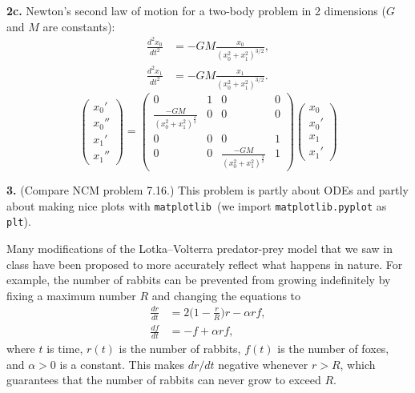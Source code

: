 \documentclass[11pt]{article}
\newcommand{\matplotlib}{{\tt matplotlib}}  %
\begin{document}
\par\bigskip
{\bf 2c.} Newton's second law of motion for a two-body problem in 2 dimensions 
($G$ and $M$ are constants):
\begin{align}
\frac{d^2 x_0}{dt^2} &= -GM\frac{x_0}{(x_0^2 + x_1^2)^{3/2}}, \\
\frac{d^2 x_1}{dt^2} &= -GM\frac{x_1}{(x_0^2 + x_1^2)^{3/2}}.
\end{align}
$$\left(
   \begin{array}{c}
      x_0'\\ 	
      x_0''\\
       	x_1'\\x_1''
   \end{array} \right)=
   \left(
   \begin{array}{cccc}
      0&1&0&0 \\ 	
      \frac{-GM}{(x_0^2+x_1^2)^{\frac{3}{2}}}&0 	&0&0\\
      0&0&0&1\\
      0&0&\frac{-GM}{(x_0^2+x_1^2)^{\frac{3}{2}}}&1
   \end{array} \right)
   \left(
   \begin{array}{c}
      x_0\\ 	
      x_0'\\ x_1 \\	x_1'
   \end{array} \right)$$

\par\bigskip
{\bf 3.} (Compare NCM problem 7.16.)
This problem is partly about ODEs and partly about making nice plots with
\matplotlib\ (we import {\tt matplotlib.pyplot} as {\tt plt}).

Many modifications of the Lotka--Volterra predator-prey model
that we saw in class have been proposed to
more accurately reflect what happens in nature.
For example, the number of rabbits can be prevented from growing
indefinitely by fixing a maximum number $R$ and changing the equations to
\begin{align}
\frac{dr}{dt} &= 2\Big(1-\frac{r}{R}\Big)r - \alpha rf, \\
\frac{df}{dt} &= -f + \alpha rf,
\end{align}
where $t$ is time, $r(t)$ is the number of rabbits, 
$f(t)$ is the number of foxes, and $\alpha>0$ is a constant.
This makes $dr/dt$ negative whenever $r > R$, 
which guarantees that the number of rabbits can never grow to exceed $R$.
\end{document}
